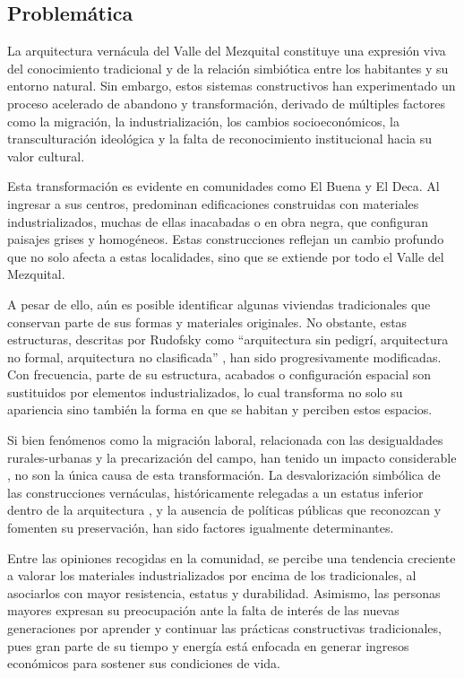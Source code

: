 \subsection{Problemática}

La arquitectura vernácula del Valle del Mezquital constituye una expresión viva del conocimiento tradicional y de la relación simbiótica entre los habitantes y su entorno natural. Sin embargo, estos sistemas constructivos han experimentado un proceso acelerado de abandono y transformación, derivado de múltiples factores como la migración, la industrialización, los cambios socioeconómicos, la transculturación ideológica y la falta de reconocimiento institucional hacia su valor cultural.

Esta transformación es evidente en comunidades como El Buena y El Deca. Al ingresar a sus centros, predominan edificaciones construidas con materiales industrializados, muchas de ellas inacabadas o en obra negra, que configuran paisajes grises y homogéneos. Estas construcciones reflejan un cambio profundo que no solo afecta a estas localidades, sino que se extiende por todo el Valle del Mezquital.

A pesar de ello, aún es posible identificar algunas viviendas tradicionales que conservan parte de sus formas y materiales originales. No obstante, estas estructuras, descritas por Rudofsky como ``arquitectura sin pedigrí, arquitectura no formal, arquitectura no clasificada'' \citep[p. 9]{rudofsky1964}, han sido progresivamente modificadas. Con frecuencia, parte de su estructura, acabados o configuración espacial son sustituidos por elementos industrializados, lo cual transforma no solo su apariencia sino también la forma en que se habitan y perciben estos espacios.

Si bien fenómenos como la migración laboral, relacionada con las desigualdades rurales-urbanas y la precarización del campo, han tenido un impacto considerable \citep{monroy2009, boils2010dadho}, no son la única causa de esta transformación. La desvalorización simbólica de las construcciones vernáculas, históricamente relegadas a un estatus inferior dentro de la arquitectura \citep[p. 2]{torres1999revista}, y la ausencia de políticas públicas que reconozcan y fomenten su preservación, han sido factores igualmente determinantes.

Entre las opiniones recogidas en la comunidad, se percibe una tendencia creciente a valorar los materiales industrializados por encima de los tradicionales, al asociarlos con mayor resistencia, estatus y durabilidad. Asimismo, las personas mayores expresan su preocupación ante la falta de interés de las nuevas generaciones por aprender y continuar las prácticas constructivas tradicionales, pues gran parte de su tiempo y energía está enfocada en generar ingresos económicos para sostener sus condiciones de vida.


